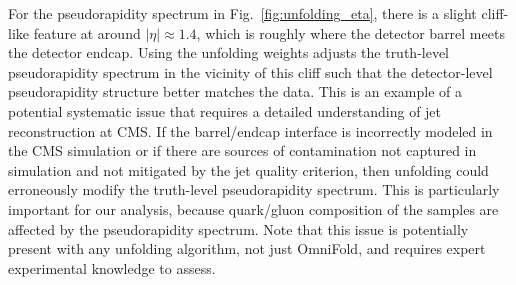 \documentclass[aps,prd,twocolumn,preprintnumbers,nofootinbib,longbibliography,floatfix]{revtex4-1}
\DeclareRobustCommand{\Sec}[1]{Sec.~\ref{#1}}
\DeclareRobustCommand{\App}[1]{App.~\ref{#1}}
\DeclareRobustCommand{\Fig}[1]{Fig.~\ref{#1}}
\newcommand{\Pythia}{{\sc Pythia}\xspace}
\newcommand{\OmniFold}{{\sc OmniFold}\xspace}
\newcommand{\cor}[1]{#1}
\begin{document}
For the pseudorapidity spectrum in \Fig{fig:unfolding_eta}, there is a slight cliff-like feature at around $|\eta| \approx 1.4$, which is roughly where the detector barrel meets the detector endcap.
%
\cor{Using the unfolding weights} adjusts the truth-level pseudorapidity spectrum in the vicinity of this cliff such that the detector-level pseudorapidity structure better matches the data.
%
This is an example of a potential systematic issue that requires a detailed understanding of jet reconstruction at CMS.
%
If the barrel/endcap interface is incorrectly modeled in the CMS simulation \cor{or if there are sources of contamination not captured in simulation and not mitigated by the jet quality criterion,} then unfolding could erroneously modify the truth-level pseudorapidity spectrum.
%
This is particularly important for our analysis, because quark/gluon composition of the samples are affected by the pseudorapidity spectrum.
%
Note that this issue is potentially present with any unfolding algorithm, not just \OmniFold, and requires expert experimental knowledge to assess.

\begin{figure*}[t]
\centering
{}
\\
%
\caption{Particle-level distributions for forward (purple) and central (pink) jets for the six substructure observables from \Sec{subsec:observables}.
%
We compare central-value-unfolded results from the CMS 2011 Open Data (data points) to \Pythia 6.4.25 (solid curve), where the differences are subtle but noticeable.
%
The CVU distributions are inputs for the subsequent jet topics analyses.
%
See \App{sec:pythia_only_analysis} for results obtained from the \Pythia distributions.
%
The error bars correspond to statistical uncertainties only.
}
\label{fig:forw_vs_cent_gen}
\end{figure*}
\end{document}
